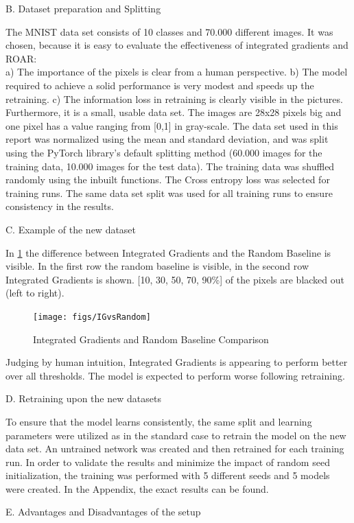 B. Dataset preparation and Splitting

The MNIST data set consists of 10 classes and 70.000 different images. It was chosen, because it is easy to evaluate the effectiveness of integrated gradients and ROAR:\\ a) The importance of the pixels is clear from a human perspective. b) The model required to achieve a solid performance is very modest and speeds up the retraining. c) The information loss in retraining is clearly visible in the pictures. Furthermore, it is a small, usable data set. The images are 28x28 pixels big and one pixel has a value ranging from [0,1] in gray-scale. The data set used in this report was normalized using the mean and standard deviation, and was split using the PyTorch library’s default splitting method (60.000 images for the training data, 10.000 images for the test data). The training data was shuffled randomly using the inbuilt functions. The Cross entropy loss was selected for training runs. The same data set split was used for all training runs to ensure consistency in the results.

C. Example of the new dataset

In \ref{fig:IGvsRandom} the difference between Integrated Gradients and the Random Baseline is visible. In the first row the random baseline is visible, in the second row Integrated Gradients is shown. [10, 30, 50, 70, 90\%] of the pixels are blacked out (left to right).

\begin{figure}[h!]
	\centering
	\texttt{[image: figs/IGvsRandom]}
	\caption{Integrated Gradients and Random Baseline Comparison}
	\label{fig:IGvsRandom}
\end{figure}

Judging by human intuition, Integrated Gradients is appearing to perform better over all thresholds. The model is expected to perform worse following retraining.

D. Retraining upon the new datasets

To ensure that the model learns consistently, the same split and learning parameters were utilized as in the standard case to retrain the model on the new data set. An untrained network was created and then retrained for each training run. In order to validate the results and minimize the impact of random seed initialization, the training was performed with 5 different seeds and 5 models were created. In the Appendix, the exact results can be found.

E. Advantages and Disadvantages of the setup

